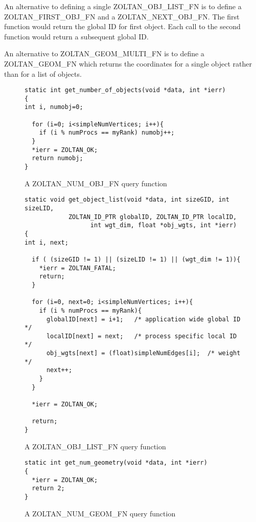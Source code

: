An alternative to defining a single ZOLTAN\_OBJ\_LIST\_FN is to define
a ZOLTAN\_FIRST\_OBJ\_FN and a ZOLTAN\_NEXT\_OBJ\_FN.  The first function
would return the global ID for first object.  Each call to the second function would
return a subsequent global ID.

An alternative to ZOLTAN\_GEOM\_MULTI\_FN is to define a ZOLTAN\_GEOM\_FN which
returns the coordinates for a single object rather than for a list
of objects.

\begin{figure}
\begin{flushleft}
\begin{verbatim}
static int get_number_of_objects(void *data, int *ierr)
{
int i, numobj=0;

  for (i=0; i<simpleNumVertices; i++){
    if (i % numProcs == myRank) numobj++;
  }
  *ierr = ZOLTAN_OK;
  return numobj;
}
\end{verbatim}
\end{flushleft}
\caption{A ZOLTAN\_NUM\_OBJ\_FN query function}
\label{fig:NumObj}
\end{figure}

\begin{figure}
\begin{flushleft}
\begin{verbatim}
static void get_object_list(void *data, int sizeGID, int sizeLID,
            ZOLTAN_ID_PTR globalID, ZOLTAN_ID_PTR localID,
                  int wgt_dim, float *obj_wgts, int *ierr)
{
int i, next;

  if ( (sizeGID != 1) || (sizeLID != 1) || (wgt_dim != 1)){ 
    *ierr = ZOLTAN_FATAL;
    return;
  }

  for (i=0, next=0; i<simpleNumVertices; i++){
    if (i % numProcs == myRank){
      globalID[next] = i+1;   /* application wide global ID */
      localID[next] = next;   /* process specific local ID  */
      obj_wgts[next] = (float)simpleNumEdges[i];  /* weight */
      next++;
    }
  }

  *ierr = ZOLTAN_OK;

  return;
}
\end{verbatim}
\end{flushleft}
\caption{A ZOLTAN\_OBJ\_LIST\_FN query function}
\label{fig:ObjList}
\end{figure}

\begin{figure}
\begin{flushleft}
\begin{verbatim}
static int get_num_geometry(void *data, int *ierr)
{
  *ierr = ZOLTAN_OK;
  return 2;
}
\end{verbatim}
\end{flushleft}
\caption{A ZOLTAN\_NUM\_GEOM\_FN query function}
\label{fig:NumGeom}
\end{figure}

